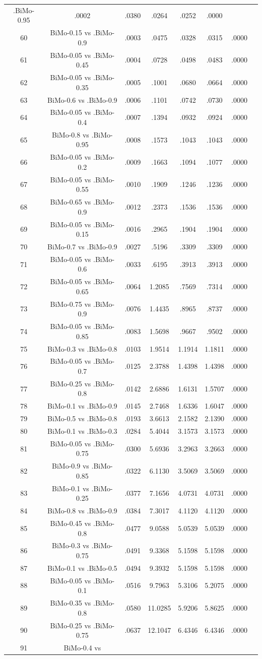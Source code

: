 \documentclass[a4paper,10pt]{article}
\begin{document}
\begin{landscape}
\begin{table}[!htp]
\begin{tabular}{cccccccc}
.BiMo-0.95&.0002&.0380&.0264&.0252&.0000\\60&BiMo-0.15 vs .BiMo-0.9&.0003&.0475&.0328&.0315&.0000\\61&BiMo-0.05 vs .BiMo-0.45&.0004&.0728&.0498&.0483&.0000\\62&BiMo-0.05 vs .BiMo-0.35&.0005&.1001&.0680&.0664&.0000\\63&BiMo-0.6 vs .BiMo-0.9&.0006&.1101&.0742&.0730&.0000\\64&BiMo-0.05 vs .BiMo-0.4&.0007&.1394&.0932&.0924&.0000\\65&BiMo-0.8 vs .BiMo-0.95&.0008&.1573&.1043&.1043&.0000\\66&BiMo-0.05 vs .BiMo-0.2&.0009&.1663&.1094&.1077&.0000\\67&BiMo-0.05 vs .BiMo-0.55&.0010&.1909&.1246&.1236&.0000\\68&BiMo-0.65 vs .BiMo-0.9&.0012&.2373&.1536&.1536&.0000\\69&BiMo-0.05 vs .BiMo-0.15&.0016&.2965&.1904&.1904&.0000\\70&BiMo-0.7 vs .BiMo-0.9&.0027&.5196&.3309&.3309&.0000\\71&BiMo-0.05 vs .BiMo-0.6&.0033&.6195&.3913&.3913&.0000\\72&BiMo-0.05 vs .BiMo-0.65&.0064&1.2085&.7569&.7314&.0000\\73&BiMo-0.75 vs .BiMo-0.9&.0076&1.4435&.8965&.8737&.0000\\74&BiMo-0.05 vs .BiMo-0.85&.0083&1.5698&.9667&.9502&.0000\\75&BiMo-0.3 vs .BiMo-0.8&.0103&1.9514&1.1914&1.1811&.0000\\76&BiMo-0.05 vs .BiMo-0.7&.0125&2.3788&1.4398&1.4398&.0000\\77&BiMo-0.25 vs .BiMo-0.8&.0142&2.6886&1.6131&1.5707&.0000\\78&BiMo-0.1 vs .BiMo-0.9&.0145&2.7468&1.6336&1.6047&.0000\\79&BiMo-0.5 vs .BiMo-0.8&.0193&3.6613&2.1582&2.1390&.0000\\80&BiMo-0.1 vs .BiMo-0.3&.0284&5.4044&3.1573&3.1573&.0000\\81&BiMo-0.05 vs .BiMo-0.75&.0300&5.6936&3.2963&3.2663&.0000\\82&BiMo-0.9 vs .BiMo-0.85&.0322&6.1130&3.5069&3.5069&.0000\\83&BiMo-0.1 vs .BiMo-0.25&.0377&7.1656&4.0731&4.0731&.0000\\84&BiMo-0.8 vs .BiMo-0.9&.0384&7.3017&4.1120&4.1120&.0000\\85&BiMo-0.45 vs .BiMo-0.8&.0477&9.0588&5.0539&5.0539&.0000\\86&BiMo-0.3 vs .BiMo-0.75&.0491&9.3368&5.1598&5.1598&.0000\\87&BiMo-0.1 vs .BiMo-0.5&.0494&9.3932&5.1598&5.1598&.0000\\88&BiMo-0.05 vs .BiMo-0.1&.0516&9.7963&5.3106&5.2075&.0000\\89&BiMo-0.35 vs .BiMo-0.8&.0580&11.0285&5.9206&5.8625&.0000\\90&BiMo-0.25 vs .BiMo-0.75&.0637&12.1047&6.4346&6.4346&.0000\\91&BiMo-0.4 vs 
\end{tabular}
\end{table}
\end{landscape}
\end{document}
